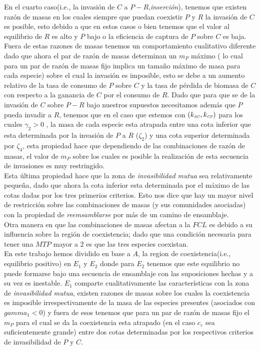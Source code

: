 En el cuarto caso(i.e., la invasi\'on de $C$ a $P-R$,\emph{inserci\'on}), tenemos que existen raz\'on de masas en los cuales siempre que puedan coexistir $P$ y $R$ la invasi\'on de $C$ es posible, esto debido a que en estos casos o bien tenemos que el valor al equilibrio de $R$ es alto y $P$ bajo o la eficiencia de captura de $P$ sobre $C$ es baja. Fuera de estas razones de masas tenemos un comportamiento cualitativo diferente dado que ahora el par de raz\'on de masas determinan un $m_P$ m\'aximo ( lo cual para un par de raz\'on de masas fijo implica un tama\~no m\'aximo de masa para cada especie) sobre el cual la invasi\'on es imposible, esto se debe a un aumento relativo de la tasa de consumo de $P$ sobre $C$ y la tasa de p\'erdida de biomasa de $C$ con respecto a la ganancia de $C$ por el consumo de $R$. Dado que para que se de la invasi\'on de $C$ sobre $P-R$ bajo nuestros supuestos necesitamos adem\'as que $P$ pueda invadir a $R$, tenemos que en el caso que estemos con $(k_{\textit{\tiny RC}}, k_{\textit{\tiny CP}})$ para los cuales $\gamma_2 > 0$ , la masa de cada especie esta atrapada entre una cota inferior que esta determinada por la invasi\'on de $P$ a $R$ ($\zeta_2$) y una cota superior determinada por $\zeta_4$, esta propiedad hace que dependiendo de las combinaciones de raz\'on de masas, el valor de $m_P$ sobre los cuales es posible la realizaci\'on de esta secuencia de invasiones es muy restringido.\\

Esta \'ultima propiedad hace que la zona de \emph{invasibilidad mutua} sea relativamente peque\~na, dado que ahora la cota inferior esta determinada por el m\'aximo de las cotas dadas por los tres primerios criterios. Esto nos dice que hay un mayor nivel de restricci\'on sobre las combinaciones de masas (y sus comunidades asociadas) con la propiedad de \emph{reemsamblarse} por m\'as de un camino de ensamblaje.\\

Otra manera en que las combinaciones de masas afectan a la $FCL$ es debido a su influencia sobre la regi\'on de coexistencia; dado que una condici\'on necesaria para tener una $MTP$ mayor a 2 es que las tres especies coexistan.\\

En este trabajo hemos dividido en base a $A$, la region de coexistencia(i.e., equilibrio positivo) en $E_1$ y $E_2$ donde para $E_2$ tenemos que este equilibrio no puede formarse bajo una secuencia de ensamblaje con las suposiciones hechas y a su vez es inestable. $E_1$ comparte cualitativamente las caracter\'isticas con la zona de \emph{invasibilidad mutua}, existen razones de masas sobre los cuales la coexistencia es imposible irrespectivamente de la masa de las especies presentes (asociados con $gamma_1 < 0$) y fuera de esos tenemos que para un par de raz\'on de masas fijo el $m_P$ para el cual se da la coexistencia esta atrapado (en el caso $c_\varepsilon$ sea suficientemente grande) entre dos cotas determinadas por los respectivos criterios de invasibilidad de $P$ y $C$. \\

